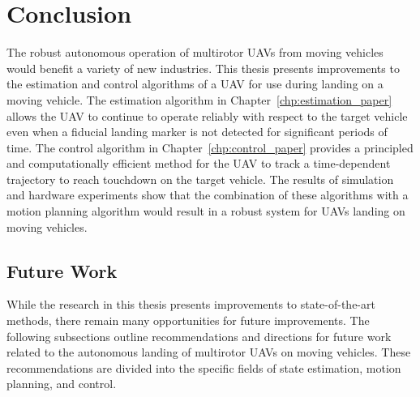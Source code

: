 
\chapter{Conclusion}
\label{chp:conclusion}

The robust autonomous operation of multirotor UAVs from moving vehicles would benefit a
variety of new industries.
This
thesis presents improvements to the estimation and control algorithms of a UAV
for use during landing on a moving vehicle. The estimation algorithm in
Chapter~\ref{chp:estimation_paper}
allows the UAV to continue to operate reliably with respect to the target vehicle
even when a fiducial landing marker is not detected for significant
periods of time.
The control algorithm in Chapter~\ref{chp:control_paper} provides a principled
and computationally efficient method for the UAV to track a time-dependent
trajectory to reach touchdown on the target vehicle. The results of simulation and hardware
experiments show that the combination of these
algorithms with a motion planning algorithm would result in a robust
system for UAVs landing on moving vehicles.

\section{Future Work}
\label{sec:future_work}
While the research in this thesis presents improvements to 
state-of-the-art methods, there remain many opportunities for future
improvements.
The following subsections outline
recommendations and directions for future work related to the autonomous
landing of multirotor UAVs on moving vehicles.
These recommendations are divided into the specific fields of state estimation,
motion planning, and control.

